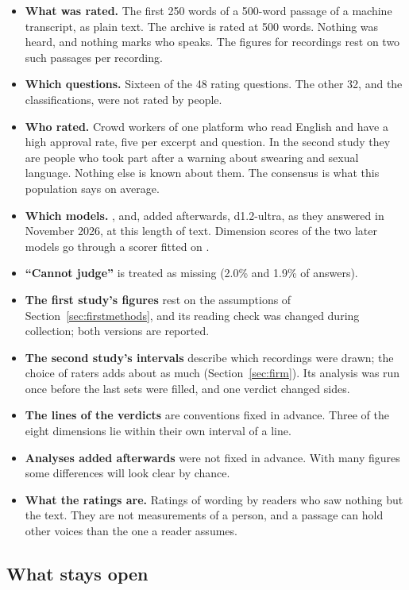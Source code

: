 \begin{itemize}
\item \textbf{What was rated.} The first 250 words of a 500-word passage of a machine transcript, as plain text.
  The archive is rated at 500 words. Nothing was heard, and nothing marks who speaks. The figures for
  recordings rest on two such passages per recording.
\item \textbf{Which questions.} Sixteen of the 48 rating questions. The other 32, and the classifications, were
  not rated by people.
\item \textbf{Who rated.} Crowd workers of one platform who read English and have a high approval rate, five per
  excerpt and question. In the second study they are people who took part after a warning about swearing and
  sexual language. Nothing else is known about them. The consensus is what this population says on average.
\item \textbf{Which models.} \jev{}, \drex{} and, added afterwards, d1.2-ultra, as they answered in November
  2026, at this length of text. Dimension scores of the two later models go through a scorer fitted on \jev{}.
\item \textbf{``Cannot judge''} is treated as missing (2.0\% and 1.9\% of answers).
\item \textbf{The first study's figures} rest on the assumptions of Section~\ref{sec:firstmethods}, and its
  reading check was changed during collection; both versions are reported.
\item \textbf{The second study's intervals} describe which recordings were drawn; the choice of raters adds
  about as much (Section~\ref{sec:firm}). Its analysis was run once before the last sets were filled, and one
  verdict changed sides.
\item \textbf{The lines of the verdicts} are conventions fixed in advance. Three of the eight dimensions lie
  within their own interval of a line.
\item \textbf{Analyses added afterwards} were not fixed in advance. With many figures some differences will look
  clear by chance.
\item \textbf{What the ratings are.} Ratings of wording by readers who saw nothing but the text. They are not
  measurements of a person, and a passage can hold other voices than the one a reader assumes.
\end{itemize}

\subsection{What stays open}\label{sec:open}

